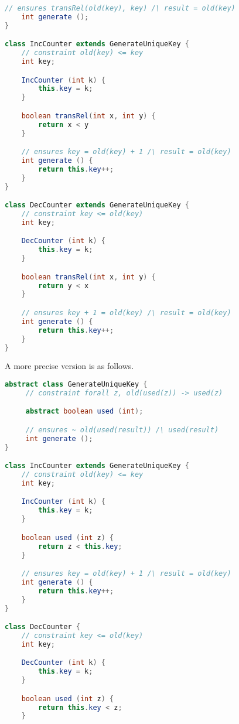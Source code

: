 \documentclass{article}
\begin{document}
\begin{example}
\begin{lstlisting}[language=Java, escapechar=|]
    // ensures transRel(old(key), key) /\ result = old(key)
    int generate ();
}

class IncCounter extends GenerateUniqueKey {
    // constraint old(key) <= key
    int key;

    IncCounter (int k) {
        this.key = k;
    }

    boolean transRel(int x, int y) {
        return x < y
    }

    // ensures key = old(key) + 1 /\ result = old(key)
    int generate () {
        return this.key++;
    }
}

class DecCounter extends GenerateUniqueKey {
    // constraint key <= old(key)
    int key;

    DecCounter (int k) {
        this.key = k;
    }

    boolean transRel(int x, int y) {
        return y < x
    }

    // ensures key + 1 = old(key) /\ result = old(key)
    int generate () {
        return this.key++;
    }
}
\end{lstlisting}
  A more precise version is as follows.
\begin{lstlisting}[language=Java, escapechar=|]
abstract class GenerateUniqueKey {
     // constraint forall z, old(used(z)) -> used(z)

     abstract boolean used (int);

     // ensures ~ old(used(result)) /\ used(result)
     int generate ();
}

class IncCounter extends GenerateUniqueKey {
    // constraint old(key) <= key
    int key;

    IncCounter (int k) {
        this.key = k;
    }

    boolean used (int z) {
        return z < this.key;
    }

    // ensures key = old(key) + 1 /\ result = old(key)
    int generate () {
        return this.key++;
    }
}

class DecCounter {
    // constraint key <= old(key)
    int key;

    DecCounter (int k) {
        this.key = k;
    }

    boolean used (int z) {
        return this.key < z;
    }


\end{lstlisting}
\end{example}
\end{document}
